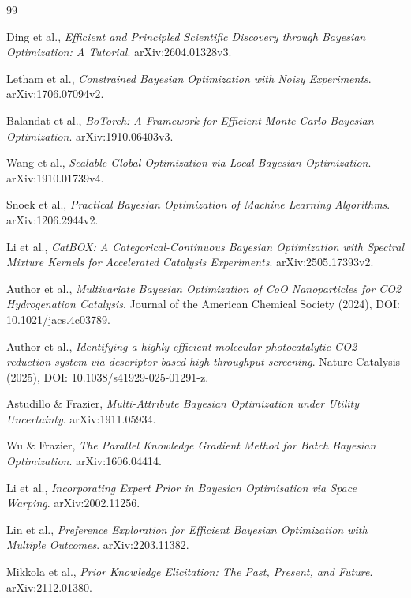 \documentclass[12pt,a4paper]{article}
\begin{document}
\newpage
\begin{thebibliography}{99}

Ding et al., \textit{Efficient and Principled Scientific Discovery through Bayesian Optimization: A Tutorial}. arXiv:2604.01328v3.

Letham et al., \textit{Constrained Bayesian Optimization with Noisy Experiments}. arXiv:1706.07094v2.

Balandat et al., \textit{BoTorch: A Framework for Efficient Monte-Carlo Bayesian Optimization}. arXiv:1910.06403v3.

Wang et al., \textit{Scalable Global Optimization via Local Bayesian Optimization}. arXiv:1910.01739v4.

Snoek et al., \textit{Practical Bayesian Optimization of Machine Learning Algorithms}. arXiv:1206.2944v2.

Li et al., \textit{CatBOX: A Categorical-Continuous Bayesian Optimization with Spectral Mixture Kernels for Accelerated Catalysis Experiments}. arXiv:2505.17393v2.

Author et al., \textit{Multivariate Bayesian Optimization of CoO Nanoparticles for CO2 Hydrogenation Catalysis}. Journal of the American Chemical Society (2024), DOI: 10.1021/jacs.4c03789.

Author et al., \textit{Identifying a highly efficient molecular photocatalytic CO2 reduction system via descriptor-based high-throughput screening}. Nature Catalysis (2025), DOI: 10.1038/s41929-025-01291-z.

Astudillo \& Frazier, \textit{Multi-Attribute Bayesian Optimization under Utility Uncertainty}. arXiv:1911.05934.

Wu \& Frazier, \textit{The Parallel Knowledge Gradient Method for Batch Bayesian Optimization}. arXiv:1606.04414.

Li et al., \textit{Incorporating Expert Prior in Bayesian Optimisation via Space Warping}. arXiv:2002.11256.

Lin et al., \textit{Preference Exploration for Efficient Bayesian Optimization with Multiple Outcomes}. arXiv:2203.11382.

Mikkola et al., \textit{Prior Knowledge Elicitation: The Past, Present, and Future}. arXiv:2112.01380.


\end{thebibliography}
\end{document}
